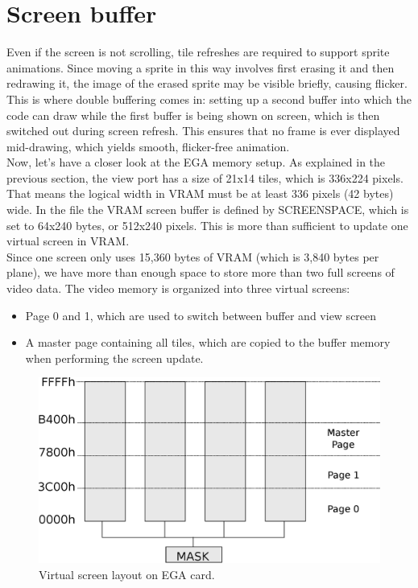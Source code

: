 \documentclass[book.tex]{subfiles}
\begin{document}
\section{Screen buffer}
Even if the screen is not scrolling, tile refreshes are required to support sprite animations. Since moving a sprite in this way involves first erasing it and then redrawing it, the image of the erased sprite may be visible briefly, causing flicker. This is where double buffering comes in: setting up a second buffer into which the code can draw while the first buffer is being shown on screen, which is then switched out during screen refresh. This ensures that no frame is ever displayed mid-drawing, which yields smooth, flicker-free animation.\\

Now, let's have a closer look at the EGA memory setup. As explained in the previous section, the view port has a size of 21x14 tiles, which is 336x224 pixels. That means the logical width in VRAM must be at least 336 pixels (42 bytes) wide. In the file  the VRAM screen buffer is defined by SCREENSPACE, which is set to 64x240 bytes, or 512x240 pixels. This is more than sufficient to update one virtual screen in VRAM.\\

Since one screen only uses 15,360 bytes of VRAM (which is 3,840 bytes per plane), we have more than enough space to store more than two full screens of video data. The video memory is organized into three virtual screens:
\begin{itemize}
\item Page 0 and 1, which are used to switch between buffer and view screen
\item A master page containing all tiles, which are copied to the buffer memory when performing the screen update.
\end{itemize}
\par

\begin{figure}[H]
\centering
\includegraphics[width=\textwidth]{imgs/drawings/ega_ram_architecture.eps}
\caption{Virtual screen layout on EGA card.}
\label{fig:ega_ram_arch}
\end{figure}
\end{document}
